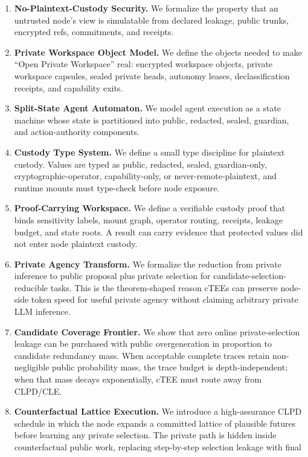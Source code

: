 \documentclass[11pt]{article}
\begin{document}
\begin{enumerate}[leftmargin=1.5em]
\item \textbf{No-Plaintext-Custody Security.} We formalize the property that an
untrusted node's view is simulatable from declared leakage, public trunks,
encrypted refs, commitments, and receipts.
\item \textbf{Private Workspace Object Model.} We define the objects needed to
make ``Open Private Workspace'' real: encrypted workspace objects, private
workspace capsules, sealed private heads, autonomy leases, declassification
receipts, and capability exits.
\item \textbf{Split-State Agent Automaton.} We model agent execution as a state
machine whose state is partitioned into public, redacted, sealed, guardian, and
action-authority components.
\item \textbf{Custody Type System.} We define a small type discipline for
plaintext custody. Values are typed as public, redacted, sealed, guardian-only,
cryptographic-operator, capability-only, or never-remote-plaintext, and runtime
mounts must type-check before node exposure.
\item \textbf{Proof-Carrying Workspace.} We define a verifiable custody proof
that binds sensitivity labels, mount graph, operator routing, receipts, leakage
budget, and state roots. A result can carry evidence that protected values did
not enter node plaintext custody.
\item \textbf{Private Agency Transform.} We formalize the reduction from
private inference to public proposal plus private selection for
candidate-selection-reducible tasks. This is the theorem-shaped reason cTEEs
can preserve node-side token speed for useful private agency without claiming
arbitrary private LLM inference.
\item \textbf{Candidate Coverage Frontier.} We show that zero online
private-selection leakage can be purchased with public overgeneration in
proportion to candidate redundancy mass. When acceptable complete traces retain
non-negligible public probability mass, the trace budget is depth-independent;
when that mass decays exponentially, cTEE must route away from CLPD/CLE.
\item \textbf{Counterfactual Lattice Execution.} We introduce a high-assurance
CLPD schedule in which the node expands a committed lattice of plausible
futures before learning any private selection. The private path is hidden inside
counterfactual public work, replacing step-by-step selection leakage with final

\end{enumerate}
\end{document}
